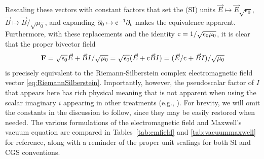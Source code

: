 \documentclass[1p,sort&compress]{elsarticle}
\numberwithin{equation}{section}
\newcommand{\rv}[1]{\vec{#1}}
\newcommand{\bv}[1]{\mathbf{#1}}
\newcommand{\cc}{{\rm c}}
\begin{document}
Rescaling these vectors with constant factors that set the (SI) units $\rv{E} \mapsto \rv{E}\sqrt{\epsilon_0}$, $\rv{B} \mapsto \rv{B}/\sqrt{\mu_0}$, and expanding $\partial_0 \mapsto \cc^{-1}\partial_t$ makes the equivalence apparent.  Furthermore, with these replacements and the identity $\cc = 1/\sqrt{\epsilon_0\mu_0}$, it is clear that the proper bivector field 
\begin{equation}\label{eq:emfield}
  \bv{F} = \sqrt{\epsilon_0} \rv{E} + \rv{B} I/\sqrt{\mu_0} = \sqrt{\epsilon_0}(\rv{E} + \cc \rv{B}I) = (\rv{E}/\cc + \rv{B}I)/\sqrt{\mu_0}
\end{equation}
is precisely equivalent to the Riemann-Silberstein complex electromagnetic field vector \eqref{eq:RiemannSilberstein}.  Importantly, however, the pseudoscalar factor of $I$ that appears here has rich physical meaning that is not apparent when using the scalar imaginary $i$ appearing in other treatments (e.g., \cite{Bialynicki-Birula2013}).  For brevity, we will omit the constants in the discussion to follow, since they may be easily restored when needed.  The various formulations of the electromagnetic field and Maxwell's vacuum equation are compared in Tables~\ref{tab:emfield} and \ref{tab:vacuummaxwell} for reference, along with a reminder of the proper unit scalings for both SI and CGS conventions.
\end{document}
